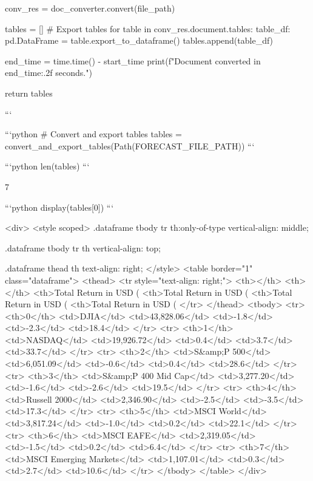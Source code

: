 {{    conv_res = doc_converter.convert(file_path)
    
    tables = []
    # Export tables
    for table in conv_res.document.tables:
        table_df: pd.DataFrame = table.export_to_dataframe()
        tables.append(table_df)

    end_time = time.time() - start_time
    print(f"Document converted in {end_time:.2f} seconds.")
    
    return tables

```


```python
# Convert and export tables
tables = convert_and_export_tables(Path(FORECAST_FILE_PATH))
```


```python
len(tables)
```




    7




```python
display(tables[0])
```


<div>
<style scoped>
    .dataframe tbody tr th:only-of-type {
        vertical-align: middle;
    }

    .dataframe tbody tr th {
        vertical-align: top;
    }

    .dataframe thead th {
        text-align: right;
    }
</style>
<table border="1" class="dataframe">
  <thead>
    <tr style="text-align: right;">
      <th></th>
      <th></th>
      <th>Total Return in USD (%
      <th>Total Return in USD (%
      <th>Total Return in USD (%
      <th>Total Return in USD (%
    </tr>
  </thead>
  <tbody>
    <tr>
      <th>0</th>
      <td>DJIA</td>
      <td>43,828.06</td>
      <td>-1.8</td>
      <td>-2.3</td>
      <td>18.4</td>
    </tr>
    <tr>
      <th>1</th>
      <td>NASDAQ</td>
      <td>19,926.72</td>
      <td>0.4</td>
      <td>3.7</td>
      <td>33.7</td>
    </tr>
    <tr>
      <th>2</th>
      <td>S&amp;P 500</td>
      <td>6,051.09</td>
      <td>-0.6</td>
      <td>0.4</td>
      <td>28.6</td>
    </tr>
    <tr>
      <th>3</th>
      <td>S&amp;P 400 Mid Cap</td>
      <td>3,277.20</td>
      <td>-1.6</td>
      <td>-2.6</td>
      <td>19.5</td>
    </tr>
    <tr>
      <th>4</th>
      <td>Russell 2000</td>
      <td>2,346.90</td>
      <td>-2.5</td>
      <td>-3.5</td>
      <td>17.3</td>
    </tr>
    <tr>
      <th>5</th>
      <td>MSCI World</td>
      <td>3,817.24</td>
      <td>-1.0</td>
      <td>0.2</td>
      <td>22.1</td>
    </tr>
    <tr>
      <th>6</th>
      <td>MSCI EAFE</td>
      <td>2,319.05</td>
      <td>-1.5</td>
      <td>0.2</td>
      <td>6.4</td>
    </tr>
    <tr>
      <th>7</th>
      <td>MSCI Emerging Markets</td>
      <td>1,107.01</td>
      <td>0.3</td>
      <td>2.7</td>
      <td>10.6</td>
    </tr>
  </tbody>
</table>
</div>



}}
